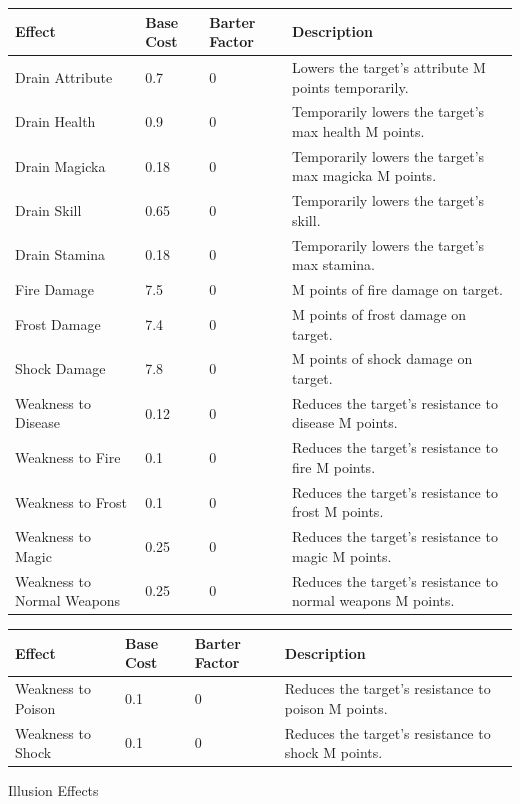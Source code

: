 \documentclass[12pt]{book}
\begin{document}
\begin{tabular}{p{}|p{}|p{}|p{}}
Effect & Base Cost & Barter Factor & Description\\ \hline
Drain Attribute & 0.7 & 0 & Lowers the target's attribute M points temporarily.\\ \hline
Drain Health & 0.9 & 0 & Temporarily lowers the target's max health M points.\\ \hline
Drain Magicka & 0.18 & 0 & Temporarily lowers the target's max magicka M points.\\ \hline
Drain Skill & 0.65 & 0 & Temporarily lowers the target's skill.\\ \hline
Drain Stamina & 0.18 & 0 & Temporarily lowers the target's max stamina.\\ \hline
Fire Damage & 7.5 & 0 & M points of fire damage on target.\\ \hline
Frost Damage & 7.4 & 0 & M points of frost damage on target.\\ \hline
Shock Damage & 7.8 & 0 & M points of shock damage on target.\\ \hline
Weakness to Disease & 0.12 & 0 & Reduces the target's resistance to disease M points.\\ \hline
Weakness to Fire & 0.1 & 0 & Reduces the target's resistance to fire M points.\\ \hline
Weakness to Frost & 0.1 & 0 & Reduces the target's resistance to frost M points.\\ \hline
Weakness to Magic & 0.25 & 0 & Reduces the target's resistance to magic M points.\\ \hline
Weakness to Normal Weapons & 0.25 & 0 & Reduces the target's resistance to normal weapons M points.\\
\end{tabular}

\begin{tabular}{p{}|p{}|p{}|p{}}
Effect & Base Cost & Barter Factor & Description\\ \hline
Weakness to Poison & 0.1 & 0 & Reduces the target's resistance to poison M points.\\ \hline
Weakness to Shock & 0.1 & 0 & Reduces the target's resistance to shock M points.
\end{tabular}

Illusion Effects
\end{document}
